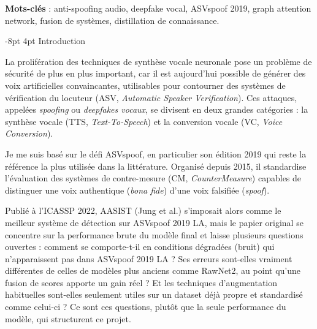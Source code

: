 \documentclass[10pt, a4paper]{article}
\makeatletter
\renewcommand{\section}{\@startsection{section}{1}{\z@}%
  {-8pt \@plus -2pt \@minus -2pt}{4pt \@plus 1pt}%
  {\normalfont\Large\bfseries}}
\makeatother
\begin{document}
\smallskip
\noindent\textbf{Mots-clés} : anti-spoofing audio, deepfake vocal, ASVspoof 2019, graph attention network, fusion de systèmes, distillation de connaissance.

\section{Introduction}

La prolifération des techniques de synthèse vocale neuronale pose un problème de sécurité de plus en plus important, car il est aujourd'hui possible de générer des voix artificielles convaincantes, utilisables pour contourner des systèmes de vérification du locuteur (ASV, \textit{Automatic Speaker Verification}). Ces attaques, appelées \textit{spoofing} ou \textit{deepfakes vocaux}, se divisent en deux grandes catégories : la synthèse vocale (TTS, \textit{Text-To-Speech}) et la conversion vocale (VC, \textit{Voice Conversion}).

Je me suis basé sur le défi ASVspoof, en particulier son édition 2019 qui reste la référence la plus utilisée dans la littérature. Organisé depuis 2015, il standardise l'évaluation des systèmes de contre-mesure (CM, \textit{CounterMeasure}) capables de distinguer une voix authentique (\textit{bona fide}) d'une voix falsifiée (\textit{spoof}).

Publié à l'ICASSP 2022, AASIST (Jung et al.) s'imposait alors comme le meilleur système de détection sur ASVspoof 2019 LA, mais le papier original se concentre sur la performance brute du modèle final et laisse plusieurs questions ouvertes : comment se comporte-t-il en conditions dégradées (bruit) qui n'apparaissent pas dans ASVspoof 2019 LA ? Ses erreurs sont-elles vraiment différentes de celles de modèles plus anciens comme RawNet2, au point qu'une fusion de scores apporte un gain réel ? Et les techniques d'augmentation habituelles sont-elles seulement utiles sur un dataset déjà propre et standardisé comme celui-ci ? Ce sont ces questions, plutôt que la seule performance du modèle, qui structurent ce projet.
\end{document}

